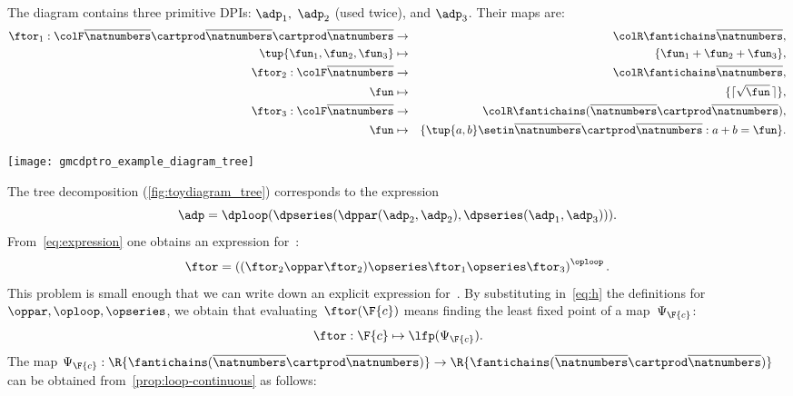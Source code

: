 The diagram contains three primitive DPIs: $\adp_{1},$ $\adp_{2}$ (used twice), and $\adp_{3}$.
Their \ftor maps are:
\begin{eqnarray*}
    \ftor_{1}:{\colF\overline{\natnumbers}\cartprod\overline{\natnumbers}\cartprod\overline{\natnumbers}} & \rightarrow & {\colR\fantichains\overline{\natnumbers}},\\
    \tup{ \fun_{1},\fun_{2},\fun_{3}}  & \mapsto & \{\fun_{1}+\fun_{2}+\fun_{3}\},\\
    \ftor_{2}:{\colF\overline{\natnumbers}} & \rightarrow & {\colR\fantichains\overline{\natnumbers}},\\
    \fun& \mapsto & \{\lceil\sqrt{\fun}\,\rceil\},\\
    \ftor_{3}:{\colF\overline{\natnumbers}} & \rightarrow & {\colR\fantichains(\overline{\natnumbers}\cartprod\overline{\natnumbers})},\\
    \fun& \mapsto & \{\tup{ a,b} \setin\overline{\natnumbers}\cartprod\overline{\natnumbers}:a+b=\fun\}.
\end{eqnarray*}
\begin{marginfigure}
    \texttt{[image: gmcdptro\_example\_diagram\_tree]}
    \caption{}
    \label{fig:toydiagram_tree}
\end{marginfigure}
The tree decomposition (\cref{fig:toydiagram_tree}) corresponds to the expression
\begin{equation}
    \adp=\dploop(\dpseries(\dppar(\adp_{2},\adp_{2}),\dpseries(\adp_{1},\adp_{3}))).
    \label{eq:expression}
\end{equation}
From~\cref{eq:expression} one obtains an expression for~\ftor:
\begin{equation}
    \ftor=\left((\ftor_{2}\oppar\ftor_{2})\opseries\ftor_{1}\opseries\ftor_{3}\right)^{\oploop}.
    \label{eq:h}
\end{equation}
This problem is small enough that we can write down an explicit expression for~\ftor.
By substituting in~\cref{eq:h} the definitions for $\oppar, \oploop, \opseries$, we obtain that evaluating~$\ftor(\F{c})$ means finding the least fixed point of a map~$\Psi_{\F{c}}$:
\begin{equation*}
    \ftor:\F{c}\mapsto\lfp(\Psi_{\F{c}}).
\end{equation*}
The map $\Psi_{\F{c}}:\R{\fantichains(\overline{\natnumbers}\cartprod\overline{\natnumbers})}\rightarrow\R{\fantichains(\overline{\natnumbers}\cartprod\overline{\natnumbers})}$ can be obtained from~\cref{prop:loop-continuous} as follows:

